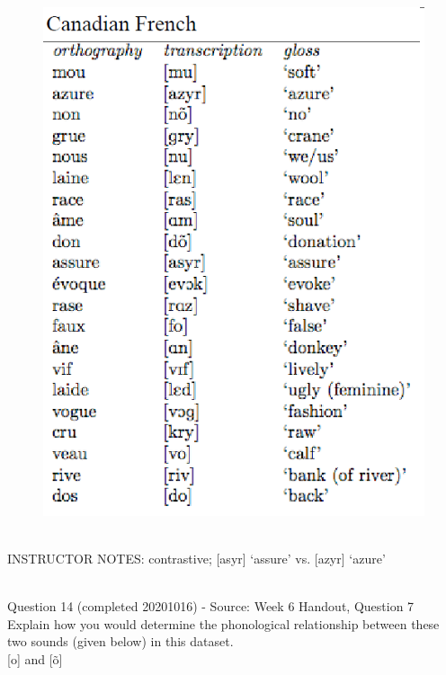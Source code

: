 \documentclass[12pt]{article}
\begin{document}
\begin{figure}[H]
\includegraphics{../images/canadianfrench.png}
\end{figure}

~\\
INSTRUCTOR NOTES: contrastive; [asyr] ‘assure’ vs. [azyr] ‘azure’


~\\

{\large Question 14} (completed 20201016) - Source: Week 6 Handout, Question 7\\

Explain how you would determine the phonological relationship between these two sounds (given below) in this dataset.\\

{[o]} and {[õ]}
\end{document}
